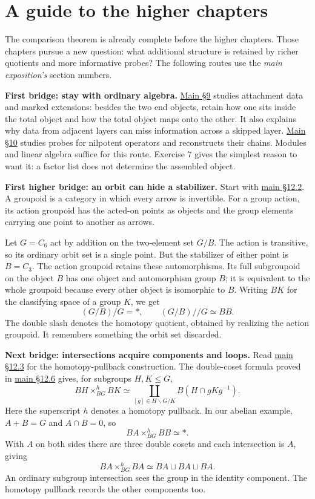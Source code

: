 \documentclass[11pt]{article}
\newcommand{\mainref}[2]{\href{https://tensorgami.com/notes/quotients-and-reconstruction.html\#section-#1}{#2}}
\begin{document}
\clearpage
\section{A guide to the higher chapters}\label{c:higher}
The comparison theorem is already complete before the higher chapters.
Those chapters pursue a new question: what additional structure is retained
by richer quotients and more informative probes? The following routes use
the \emph{main exposition's} section numbers.

\textbf{First bridge: stay with ordinary algebra.}
\mainref{9}{Main §9} studies attachment data and marked extensions:
besides the two end objects, retain how one sits inside the total object
and how the total object maps onto the other. It also explains why data
from adjacent layers can miss information across a skipped layer.
\mainref{10}{Main §10} studies probes for nilpotent operators and
reconstructs their chains. Modules and linear algebra suffice for this
route. Exercise 7 gives the simplest reason to want it: a factor list
does not determine the assembled object.

\textbf{First higher bridge: an orbit can hide a stabilizer.}
Start with \mainref{12-2}{main §12.2}. A groupoid is a category in which
every arrow is invertible. For a group action, its action groupoid has
the acted-on points as objects and the group elements carrying one point
to another as arrows.

Let \(G=C_6\) act by addition on the two-element set \(G/B\).
The action is transitive, so its ordinary orbit set is a single point.
But the stabilizer of either point is \(B=C_3\). The action groupoid
retains these automorphisms. Its full subgroupoid on the object \(B\)
has one object and automorphism group \(B\); it is equivalent to the
whole groupoid because every other object is isomorphic to \(B\).
Writing \(BK\) for the classifying space of a group \(K\), we get
\[
 (G/B)/G=*,\qquad (G/B)//G\simeq BB.
\]
The double slash denotes the homotopy quotient, obtained by realizing
the action groupoid. It remembers something the orbit set discarded.

\textbf{Next bridge: intersections acquire components and loops.}
Read \mainref{12-3}{main §12.3} for the homotopy-pullback construction.
The double-coset formula proved in \mainref{12-6}{main §12.6} gives,
for subgroups \(H,K\leq G\),
\[
 BH\times^h_{BG}BK
 \simeq\coprod_{[g]\in H\backslash G/K} B(H\cap gKg^{-1}).
\]
Here the superscript \(h\) denotes a homotopy pullback. In our abelian
example, \(A+B=G\) and \(A\cap B=0\), so
\[
 BA\times^h_{BG}BB\simeq *.
\]
With \(A\) on both sides there are three double cosets and each
intersection is \(A\), giving
\[
 BA\times^h_{BG}BA\simeq BA\sqcup BA\sqcup BA.
\]
An ordinary subgroup intersection sees the group in the identity
component. The homotopy pullback records the other components too.
\end{document}
